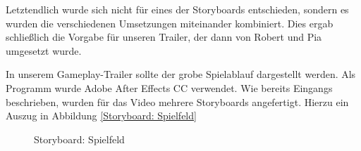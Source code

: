 Letztendlich wurde sich nicht für eines der Storyboards entschieden, sondern es wurden die verschiedenen Umsetzungen miteinander kombiniert. Dies ergab schließlich die Vorgabe für unseren Trailer, der dann von Robert und Pia umgesetzt wurde.

In unserem Gameplay-Trailer sollte der grobe Spielablauf dargestellt werden. Als Programm wurde Adobe After Effects CC verwendet.
Wie bereits Eingangs beschrieben, wurden für das Video mehrere Storyboards angefertigt. Hierzu ein Auszug in Abbildung \ref{Storyboard: Spielfeld}

\begin{figure}[h]
\centering
\qquad
\qquad
\caption{Storyboard: Spielfeld}%
 \label{fig:Storyboard: Spielfeld}%
\end{figure}

